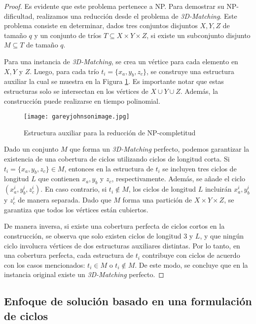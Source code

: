 \documentclass[twocolumn, fontsize=10pt]{article}
\begin{document}
\begin{proof}
Es evidente que este problema pertenece a NP. Para demostrar su NP-dificultad, realizamos una reducción desde el problema de \textit{3D-Matching}. Este problema consiste en determinar, dados tres conjuntos disjuntos $X, Y, Z$ de tamaño $q$ y un conjunto de tríos $T \subseteq X \times Y \times Z$, si existe un subconjunto disjunto $M \subseteq T$ de tamaño $q$.


Para una instancia de \textit{3D-Matching}, se crea un vértice para cada elemento en $X, Y$ y $Z$. Luego, para cada trío $t_i = \{x_a, y_b, z_c\}$, se construye una estructura auxiliar la cual se muestra en la Figura \ref{fig:gadget}. Es importante notar que estas estructuras solo se intersectan en los vértices de $X \cup Y \cup Z$. Además, la construcción puede realizarse en tiempo polinomial.

\begin{figure}[h]
    \centering
    \texttt{[image: gareyjohnsonimage.jpg]}
    \caption{Estructura auxiliar para la reducción de NP-completitud}
    \label{fig:gadget}
\end{figure}

Dado un conjunto $M$ que forma un \textit{3D-Matching} perfecto, podemos garantizar la existencia de una cobertura de ciclos utilizando ciclos de longitud corta. Si $t_i = \{x_a, y_b, z_c\} \in M$, entonces en la estructura de $t_i$ se incluyen tres ciclos de longitud $L$ que contienen $x_a, y_b$ y $z_c$, respectivamente. Además, se añade el ciclo $(x_a^i, y_b^i, z_c^i)$. En caso contrario, si $t_i \notin M$, los ciclos de longitud $L$ incluirán $x_a^i, y_b^i$ y $z_c^i$ de manera separada. Dado que $M$ forma una partición de $X \times Y \times Z$, se garantiza que todos los vértices están cubiertos.

De manera inversa, si existe una cobertura perfecta de ciclos cortos en la construcción, se observa que solo existen ciclos de longitud $3$ y $L$, y que ningún ciclo involucra vértices de dos estructuras auxiliares distintas. Por lo tanto, en una cobertura perfecta, cada estructura de $t_i$ contribuye con ciclos de acuerdo con los casos mencionados: $t_i \in M$ o $t_i \notin M$. De este modo, se concluye que en la instancia original existe un \textit{3D-Matching} perfecto.
\end{proof}


\subsection{Enfoque de solución basado en una formulación de ciclos}
\end{document}
